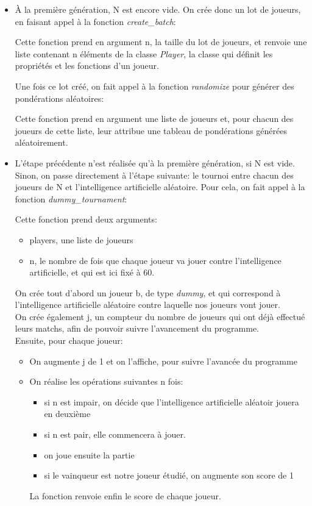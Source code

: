 \documentclass[10pt]{article}
\begin{document}
\begin{enumerate}
\begin{itemize}
\item À la première génération, N est encore vide. On crée donc un lot de joueurs, en faisant appel à la fonction \textit{create\_batch}: 

Cette fonction prend en argument n, la taille du lot de joueurs, et renvoie une liste contenant n éléments de la classe \textit{Player}, la classe qui définit les propriétés et les fonctions d'un joueur. 

 Une fois ce lot créé, on fait appel à la fonction \textit{randomize} pour générer des pondérations aléatoires: 

Cette fonction prend en argument une liste de joueurs et, pour chacun des joueurs de cette liste, leur attribue une tableau de pondérations générées aléatoirement. 

\item L'étape précédente n'est réalisée qu'à la première génération, si N est vide. Sinon, on passe directement à l'étape suivante: le tournoi entre chacun des joueurs de N et l'intelligence artificielle aléatoire. 
Pour cela, on fait appel à la fonction \textit{dummy\_tournament}: 


Cette fonction prend deux arguments: 
\begin{itemize}
    \item players, une liste de joueurs
    \item n, le nombre de fois que chaque joueur va jouer contre l'intelligence artificielle, et qui est ici fixé à 60. 
\end{itemize}
On crée tout d'abord un joueur b, de type \textit{dummy}, et qui correspond à l'intelligence artificielle aléatoire contre laquelle nos joueurs vont jouer.\\
On crée également j, un compteur du nombre de joueurs qui ont déjà effectué leurs matchs, afin de pouvoir suivre l'avancement du programme. \\
Ensuite, pour chaque joueur: 
\begin{itemize}
    \item On augmente j de 1 et on l'affiche, pour suivre l'avancée du programme
    \item On réalise les opérations suivantes n fois: 
    \begin{itemize}
        \item si n est impair, on décide que l'intelligence artificielle aléatoir jouera en deuxième
        \item si n est pair, elle commencera à jouer. 
        \item on joue ensuite la partie
        \item si le vainqueur est notre joueur étudié, on augmente son score de 1
    \end{itemize}
La fonction renvoie enfin le score de chaque joueur. 
\end{itemize}



\end{itemize}
\end{enumerate}
\end{document}
